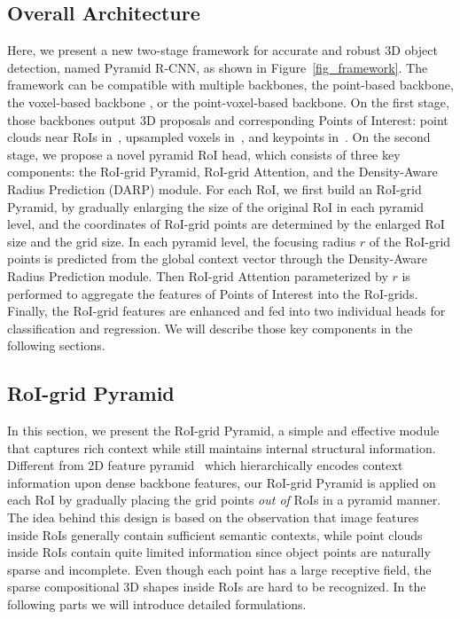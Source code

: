 \documentclass[10pt,twocolumn,letterpaper]{article}
\begin{document}
\subsection{Overall Architecture} \label{Overall Architecture}
Here, we present a new two-stage framework for accurate and robust 3D object detection, named Pyramid R-CNN, as shown in Figure~\ref{fig_framework}. The framework can be compatible with multiple backbones, \eg the point-based backbone, the voxel-based backbone , or the point-voxel-based backbone. On the first stage, those backbones output 3D proposals and corresponding Points of Interest: \eg point clouds near RoIs in~\cite{shi2019pointrcnn}, upsampled voxels in~\cite{shi2020points}, and keypoints in~\cite{shi2020pv}. On the second stage, we propose a novel pyramid RoI head, which consists of three key components: the RoI-grid Pyramid, RoI-grid Attention, and the Density-Aware Radius Prediction (DARP) module. For each RoI, we first build an RoI-grid Pyramid, by gradually enlarging the size of the original RoI in each pyramid level, and the coordinates of RoI-grid points are determined by the enlarged RoI size and the grid size. In each pyramid level, the focusing radius $r$ of the RoI-grid points is predicted from the global context vector through the Density-Aware Radius Prediction module. Then RoI-grid Attention parameterized by $r$ is performed to aggregate the features of Points of Interest into the RoI-grids. Finally, the RoI-grid features are enhanced and fed into two individual heads for classification and regression. We will describe those key components in the following sections.

\subsection{RoI-grid Pyramid} \label{RoI-grid Pyramid}

In this section, we present the RoI-grid Pyramid, a simple and effective module that captures rich context while still maintains internal structural information. Different from 2D feature pyramid~\cite{lin2017feature} which hierarchically encodes context information upon dense backbone features, our RoI-grid Pyramid is applied on each RoI by gradually placing the grid points \textit{out of} RoIs in a pyramid manner. The idea behind this design is based on the observation that image features inside RoIs generally contain sufficient semantic contexts, while point clouds inside RoIs contain quite limited information since object points are naturally sparse and incomplete. Even though each point has a large receptive field, the sparse compositional 3D shapes inside RoIs are hard to be recognized. In the following parts we will introduce detailed formulations.
\end{document}
